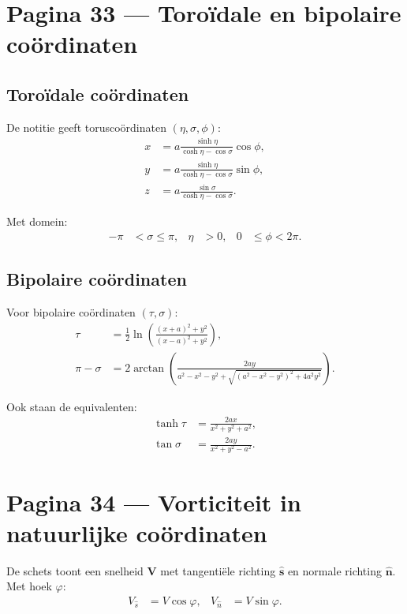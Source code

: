 \documentclass[11pt]{article}
\newcommand{\vect}[1]{\mathbf{#1}}
\begin{document}
\section*{Pagina 33 --- Toroïdale en bipolaire coördinaten}

\subsection*{Toroïdale coördinaten}

De notitie geeft toruscoördinaten $\left(\eta,\sigma,\phi\right)$:
\begin{align*}
x
&=
a\frac{\sinh\eta}{\cosh\eta-\cos\sigma}\cos\phi,
\\
y
&=
a\frac{\sinh\eta}{\cosh\eta-\cos\sigma}\sin\phi,
\\
z
&=
a\frac{\sin\sigma}{\cosh\eta-\cos\sigma}.
\end{align*}

Met domein:
\begin{align*}
-\pi &< \sigma \leq \pi,
&
\eta &> 0,
&
0 &\leq \phi < 2\pi.
\end{align*}

\subsection*{Bipolaire coördinaten}

Voor bipolaire coördinaten $\left(\tau,\sigma\right)$:
\begin{align*}
\tau
&=
\frac{1}{2}
\ln
\left(
\frac{\left(x+a\right)^2+y^2}
     {\left(x-a\right)^2+y^2}
\right),
\\
\pi-\sigma
&=
2\arctan
\left(
\frac{2ay}
     {a^2-x^2-y^2+\sqrt{\left(a^2-x^2-y^2\right)^2+4a^2y^2}}
\right).
\end{align*}

Ook staan de equivalenten:
\begin{align*}
\tanh\tau
&=
\frac{2ax}{x^2+y^2+a^2},
\\
\tan\sigma
&=
\frac{2ay}{x^2+y^2-a^2}.
\end{align*}

\newpage

\section*{Pagina 34 --- Vorticiteit in natuurlijke coördinaten}

De schets toont een snelheid $\vect{V}$ met tangentiële richting $\hat{\vect{s}}$ en normale richting $\hat{\vect{n}}$. Met hoek $\varphi$:
\begin{align*}
V_{\hat{s}}
&=
V\cos\varphi,
&
V_{\hat{n}}
&=
V\sin\varphi.
\end{align*}
\end{document}
